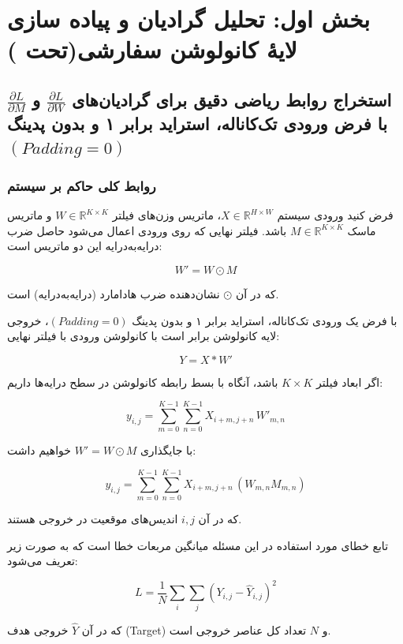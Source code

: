 \documentclass{article}
\begin{document}


\tableofcontents \clearpage
\listoffigures \clearpage
\listoftables \clearpage
\lstlistoflistings \clearpage
\newpage
\section{بخش اول: تحلیل گرادیان و پیاده سازی لایۀ کانولوشن سفارشی(تحت )}
\subsection{استخراج روابط ریاضی دقیق برای گرادیان‌های $\frac{\partial L}{\partial W}$ و $\frac{\partial L}{\partial M}$ با فرض ورودی تک‌کاناله، استراید برابر ۱ و بدون پدینگ $(Padding=0)$}

\subsubsection{روابط کلی حاکم بر سیستم}

فرض کنید ورودی سیستم $X \in \mathbb{R}^{H\times W}$، ماتریس وزن‌های فیلتر $W \in \mathbb{R}^{K\times K}$ و ماتریس ماسک $M \in \mathbb{R}^{K\times K}$ باشد. فیلتر نهایی که روی ورودی اعمال می‌شود حاصل ضرب درایه‌به‌درایه این دو ماتریس است:

\[
W' = W \odot M
\]

که در آن $\odot$ نشان‌دهنده ضرب هادامارد (درایه‌به‌درایه) است.

با فرض یک ورودی تک‌کاناله، استراید برابر ۱ و بدون پدینگ $(Padding = 0)$، خروجی لایه کانولوشن برابر است با کانولوشن ورودی با فیلتر نهایی:

\[
Y = X * W'
\]

اگر ابعاد فیلتر $K\times K$ باشد، آنگاه با بسط رابطه کانولوشن در سطح درایه‌ها داریم:

\[
y_{i,j} =
\sum_{m=0}^{K-1}
\sum_{n=0}^{K-1}
X_{i+m,j+n} \, W'_{m,n}
\]

با جایگذاری $W' = W \odot M$ خواهیم داشت:

\[
y_{i,j} =
\sum_{m=0}^{K-1}
\sum_{n=0}^{K-1}
X_{i+m,j+n}\,(W_{m,n}M_{m,n})
\]

که در آن $i,j$ اندیس‌های موقعیت در خروجی هستند.

تابع خطای مورد استفاده در این مسئله میانگین مربعات خطا  است که به صورت زیر تعریف می‌شود:

\[
L =
\frac{1}{N}
\sum_{i}\sum_{j}
(Y_{i,j}-\hat{Y}_{i,j})^2
\]

که در آن $\hat{Y}$ خروجی هدف (Target) و $N$ تعداد کل عناصر خروجی است.
\end{document}
